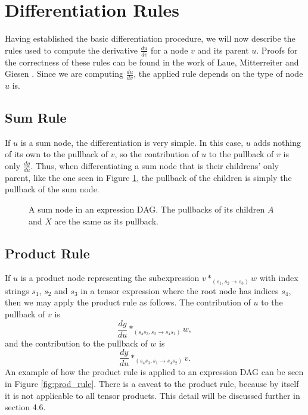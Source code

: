 \documentclass[12pt, a4paper]{report}
\begin{document}
\section{Differentiation Rules}
Having established the basic differentiation procedure, we will now describe the rules used to compute the derivative $\frac{du}{dv}$ for a node $v$ and its parent $u$.
Proofs for the correctness of these rules can be found in the work of Laue, Mitterreiter and Giesen \cite{tensorpaper}.
Since we are computing $\frac{du}{dv}$, the applied rule depends on the type of node $u$ is.

\FloatBarrier
\subsection{Sum Rule}
If $u$ is a sum node, the differentiation is very simple.
In this case, $u$ adds nothing of its own to the pullback of $v$, so the contribution of $u$ to the pullback of $v$ is only $\frac{dy}{du}$.
Thus, when differentiating a sum node that is their childrens' only parent, like the one seen in Figure \ref{fig:sum_rule}, the pullback of the children is simply the pullback of the sum node.

\begin{figure}
    \centering
    \caption{A sum node in an expression DAG. The pullbacks of its children $A$ and $X$ are the same as its pullback.}
    \label{fig:sum_rule}
\end{figure}

\FloatBarrier
\subsection{Product Rule}
If $u$ is a product node representing the subexpression $v *_{(s_1,s_2 \rightarrow s_3)} w$ with index strings $s_1$, $s_2$ and $s_3$ in a tensor expression where the root node has indices $s_4$, then we may apply the product rule as follows.
The contribution of $u$ to the pullback of $v$ is 
$$
\frac{dy}{du} *_{(s_4s_3,s_2 \rightarrow s_4s_1)} w,
$$
and the contribution to the pullback of $w$ is 
$$
\frac{dy}{du} *_{(s_4s_3,s_1 \rightarrow s_4s_2)} v.
$$
An example of how the product rule is applied to an expression DAG can be seen in Figure \ref{fig:prod_rule}.
There is a caveat to the product rule, because by itself it is not applicable to all tensor products.
This detail will be discussed further in section 4.6.
\end{document}
